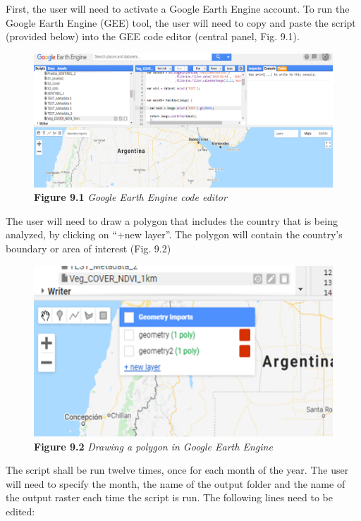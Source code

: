 \documentclass[
  10pt,
  b5paper,
]{book}
\begin{document}
First, the user will need to activate a Google Earth Engine account. To run the Google Earth Engine (GEE) tool, the user will need to copy and paste the script (provided below) into the GEE code editor (central panel, Fig. 9.1).

\begin{figure}
\centering
\includegraphics{images/Figure_9.1.png}
\caption{\textbf{Figure 9.1} \emph{Google Earth Engine code editor}}
\end{figure}

The user will need to draw a polygon that includes the country that is being analyzed, by clicking on ``+new layer''. The polygon will contain the country's boundary or area of interest (Fig. 9.2)

\begin{figure}
\centering
\includegraphics{images/Figure_9.2.png}
\caption{\textbf{Figure 9.2} \emph{Drawing a polygon in Google Earth Engine}}
\end{figure}

The script shall be run twelve times, once for each month of the year. The user will need to specify the month, the name of the output folder and the name of the output raster each time the script is run. The following lines need to be edited:
\end{document}
